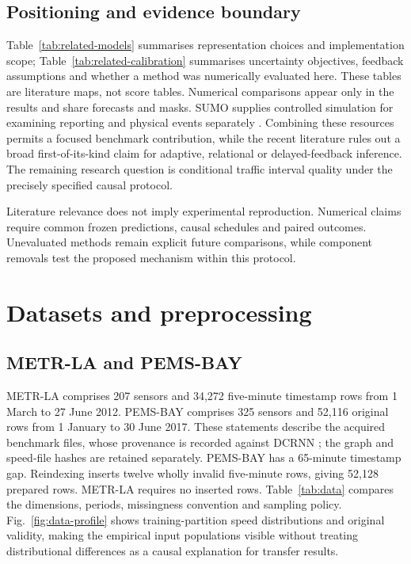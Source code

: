 \documentclass[pdflatex,sn-mathphys-num]{sn-jnl}
\begin{document}
\subsection{Positioning and evidence boundary}
Table~\ref{tab:related-models} summarises representation choices and implementation scope; Table~\ref{tab:related-calibration} summarises uncertainty objectives, feedback assumptions and whether a method was numerically evaluated here. These tables are literature maps, not score tables. Numerical comparisons appear only in the results and share forecasts and masks. SUMO supplies controlled simulation for examining reporting and physical events separately \citep{lopez2018}. Combining these resources permits a focused benchmark contribution, while the recent literature rules out a broad first-of-its-kind claim for adaptive, relational or delayed-feedback inference. The remaining research question is conditional traffic interval quality under the precisely specified causal protocol.

Literature relevance does not imply experimental reproduction. Numerical claims require common frozen predictions, causal schedules and paired outcomes. Unevaluated methods remain explicit future comparisons, while component removals test the proposed mechanism within this protocol.

\section{Datasets and preprocessing}\label{sec:data}
\subsection{METR-LA and PEMS-BAY}
METR-LA comprises 207 sensors and 34,272 five-minute timestamp rows from 1 March to 27 June 2012. PEMS-BAY comprises 325 sensors and 52,116 original rows from 1 January to 30 June 2017. These statements describe the acquired benchmark files, whose provenance is recorded against DCRNN \citep{li2018}; the graph and speed-file hashes are retained separately. PEMS-BAY has a 65-minute timestamp gap. Reindexing inserts twelve wholly invalid five-minute rows, giving 52,128 prepared rows. METR-LA requires no inserted rows. Table~\ref{tab:data} compares the dimensions, periods, missingness convention and sampling policy. Fig.~\ref{fig:data-profile} shows training-partition speed distributions and original validity, making the empirical input populations visible without treating distributional differences as a causal explanation for transfer results.
\end{document}
